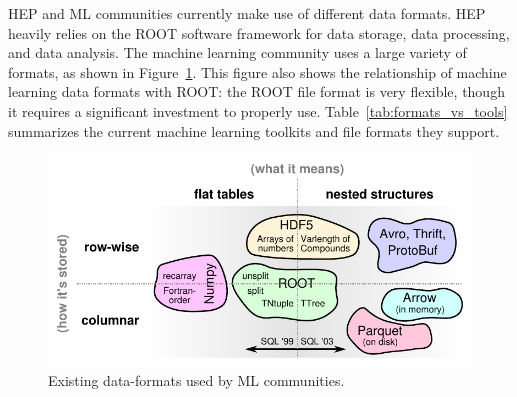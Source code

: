 HEP and ML communities currently make use of different data formats. HEP heavily relies on the ROOT software framework for data storage, data processing, and data analysis. The machine learning community uses a large variety of formats, as shown in Figure~\ref{fig:data-formats}. This figure also shows the relationship of machine learning data formats with ROOT: the ROOT file format is very flexible, though it requires a significant investment to properly use. Table~\ref{tab:formats_vs_tools} summarizes the current machine learning toolkits and file formats they support.
\begin{figure}[htbp]
 \centering
 \includegraphics{images/table-of-formats.pdf}
 \caption{Existing data-formats used by ML communities.}\label{fig:data-formats}
\end{figure}

